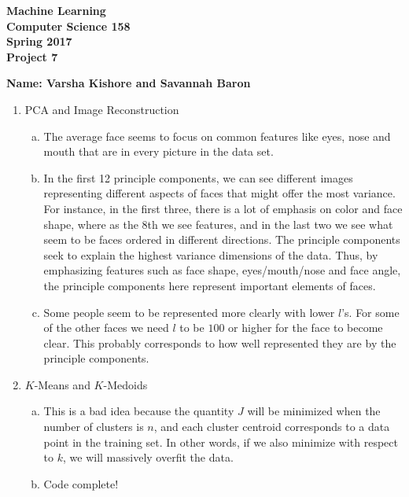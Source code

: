 \documentclass[11pt]{article}
\begin{document}
\newcommand{\Name}[1]{\noindent \textbf{Name:} #1 \\}
\newcommand{\pderiv}[2]{\frac{\partial #1}{\partial #2}}
\newcommand{\psderiv}[3]{\frac{\partial^2 #1}{\partial #2 \partial #3}}

\begin{center}
	\bf
	Machine Learning \\
	Computer Science 158 \\
	Spring 2017 \\
	\rm
	Project 7\\
\end{center}
\noindent \textbf{Name: Varsha Kishore and Savannah Baron} \\

\begin{enumerate}[1]
\item PCA and Image Reconstruction
\begin{enumerate}[(a)]
\item The average face seems to focus on common features like eyes, nose and mouth that are in every picture in the data set. 
\item In the first 12 principle components, we can see different images representing different aspects of faces that might offer the most variance. For instance, in the first three, there is a lot of emphasis on color and face shape, where as the 8th we see features, and in the last two we see what seem to be faces ordered in different directions.  The principle components seek to explain the highest variance dimensions of the data. Thus, by emphasizing features such as face shape, eyes/mouth/nose and face angle, the principle components here represent important elements of faces.
\item Some people seem to be represented more clearly with lower $l$'s. For some of the other faces we need $l$ to be $100$ or higher for the face to become clear. This probably corresponds to how well represented they are by the principle components.
\end{enumerate}
\item $K$-Means and $K$-Medoids
\begin{enumerate}[(a)]
\item This is a bad idea because the quantity $J$ will be minimized when the number of clusters
is $n$, and each cluster centroid corresponds to a data point in the training set. In other words, if we
also minimize with respect to $k$, we will massively overfit the data. 
\item Code complete!

\end{enumerate}
\end{enumerate}
\end{document}
